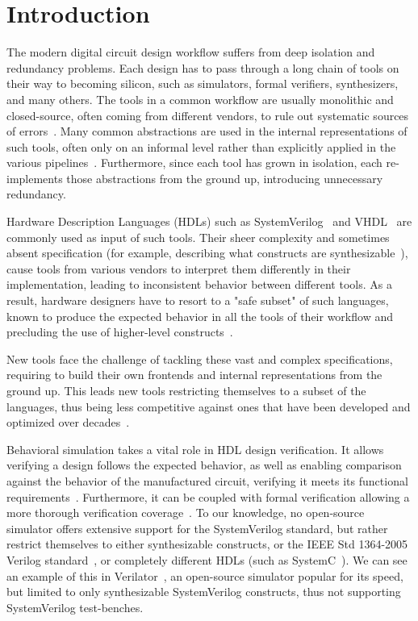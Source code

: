 \chapter{Introduction}
\label{ch:intro}
The modern digital circuit design workflow suffers from deep isolation and redundancy problems. Each design has to pass through a long chain of tools on their way to becoming silicon, such as simulators, formal verifiers, synthesizers, and many others. The tools in a common workflow are usually monolithic and closed-source, often coming from different vendors, to rule out systematic sources of errors~\cite{Schuiki2020}. Many common abstractions are used in the internal representations of such tools, often only on an informal level rather than explicitly applied in the various pipelines~\cite{Neuendorffer}. Furthermore, since each tool has grown in isolation, each re-implements those abstractions from the ground up, introducing unnecessary redundancy.

Hardware Description Languages (HDLs) such as SystemVerilog~\cite{SV2018} and VHDL~\cite{VHDL2009} are commonly used as input of such tools. Their sheer complexity and sometimes absent specification (for example, describing what constructs are synthesizable~\cite{Sutherland2006APF}), cause tools from various vendors to interpret them differently in their implementation, leading to inconsistent behavior between different tools. As a result, hardware designers have to resort to a "safe subset" of such languages, known to produce the expected behavior in all the tools of their workflow and precluding the use of higher-level constructs~\cite{Schuiki2020}.

New tools face the challenge of tackling these vast and complex specifications, requiring to build their own frontends and internal representations from the ground up. This leads new tools restricting themselves to a subset of the languages, thus being less competitive against ones that have been developed and optimized over decades~\cite{Schuiki2020}.

Behavioral simulation takes a vital role in HDL design verification. It allows verifying a design follows the expected behavior, as well as enabling comparison against the behavior of the manufactured circuit, verifying it meets its functional requirements~\cite{Ashenden1994}. Furthermore, it can be coupled with formal verification allowing a more thorough verification coverage~\cite{YuanLu2001}. To our knowledge, no open-source simulator offers extensive support for the SystemVerilog standard, but rather restrict themselves to either synthesizable constructs, or the IEEE Std 1364-2005 Verilog standard~\cite{V2006}, or completely different HDLs (such as SystemC~\cite{systemc}). We can see an example of this in Verilator~\cite{verilator}, an open-source simulator popular for its speed, but limited to only synthesizable SystemVerilog constructs, thus not supporting SystemVerilog test-benches.

